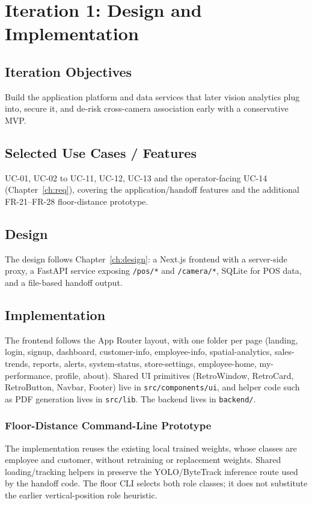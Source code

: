 \chapter{Iteration 1: Design and Implementation}
\label{ch:iter1}
\section{Iteration Objectives}
Build the application platform and data services that later vision analytics plug into, secure it, and de-risk cross-camera association early with a conservative MVP.

\section{Selected Use Cases / Features}
UC-01, UC-02 to UC-11, UC-12, UC-13 and the operator-facing UC-14 (Chapter~\ref{ch:req}), covering the application/handoff features and the additional FR-21--FR-28 floor-distance prototype.

\section{Design}
The design follows Chapter~\ref{ch:design}: a Next.js frontend with a server-side proxy, a FastAPI service exposing \texttt{/pos/*} and \texttt{/camera/*}, SQLite for POS data, and a file-based handoff output.

\section{Implementation}
The frontend follows the App Router layout, with one folder per page (landing, login, signup, dashboard, customer-info, employee-info, spatial-analytics, sales-trends, reports, alerts, system-status, store-settings, employee-home, my-performance, profile, about). Shared UI primitives (RetroWindow, RetroCard, RetroButton, Navbar, Footer) live in \texttt{src/components/ui}, and helper code such as PDF generation lives in \texttt{src/lib}. The backend lives in \texttt{backend/}.

\subsection{Floor-Distance Command-Line Prototype}
The implementation reuses the existing local trained  weights, whose classes are employee and customer, without retraining or replacement weights. Shared loading/tracking helpers in  preserve the YOLO/ByteTrack inference route used by the handoff code. The floor CLI selects both role classes; it does not substitute the earlier vertical-position role heuristic.


